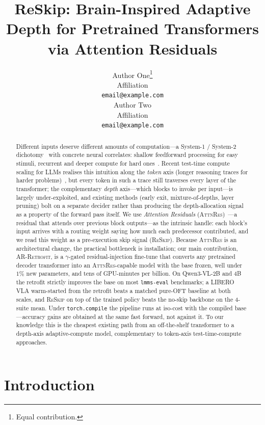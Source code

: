 \documentclass{article}
\title{ReSkip: Brain-Inspired Adaptive Depth for Pretrained Transformers\\via Attention Residuals}
\author{
  Author One\thanks{Equal contribution.} \\
  Affiliation \\
  \texttt{email@example.com} \\
  \And
  Author Two\footnotemark[1] \\
  Affiliation \\
  \texttt{email@example.com} \\
}
\newcommand{\attnres}{\textsc{AttnRes}}
\newcommand{\reskip}{\textsc{ReSkip}}
\newcommand{\retrofit}{\textsc{AR-Retrofit}}
\begin{document}
\maketitle

\begin{abstract}
Different inputs deserve different amounts of computation---a System-1 / System-2 dichotomy~\citep{kahneman2011thinking} with concrete neural correlates: shallow feedforward processing for easy stimuli, recurrent and deeper compute for hard ones~\citep{lamme2000distinct, kar2019recurrent}. Recent test-time compute scaling for LLMs realises this intuition along the \emph{token} axis (longer reasoning traces for harder problems)~\citep{openai2024o1, deepseek2025r1, snell2024scaling, wei2022chain}, but every token in such a trace still traverses every layer of the transformer; the complementary \emph{depth} axis---which blocks to invoke per input---is largely under-exploited, and existing methods (early exit, mixture-of-depths, layer pruning) bolt on a separate decider rather than producing the depth-allocation signal as a property of the forward pass itself. We use \emph{Attention Residuals} (\attnres{})~\citep{chen2026attnres}---a residual that attends over previous block outputs---as the intrinsic handle: each block's input arrives with a routing weight saying how much each predecessor contributed, and we read this weight as a pre-execution skip signal (\reskip{}). Because \attnres{} is an architectural change, the practical bottleneck is installation; our main contribution, \retrofit{}, is a $\gamma$-gated residual-injection fine-tune that converts any pretrained decoder transformer into an \attnres{}-capable model with the base frozen, well under $1\%$ new parameters, and tens of GPU-minutes per billion. On Qwen3-VL-2B and 4B the retrofit strictly improves the base on most \texttt{lmms-eval} benchmarks; a LIBERO VLA warm-started from the retrofit beats a matched pure-OFT baseline at both scales, and \reskip{} on top of the trained policy beats the no-skip backbone on the 4-suite mean. Under \texttt{torch.compile} the pipeline runs at iso-cost with the compiled base---accuracy gains are obtained at the same fast forward, not against it. To our knowledge this is the cheapest existing path from an off-the-shelf transformer to a depth-axis adaptive-compute model, complementary to token-axis test-time-compute approaches.
\end{abstract}

\section{Introduction}
\label{sec:intro}
\end{document}
